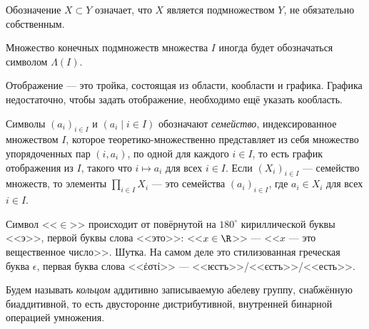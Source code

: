 \documentclass[
	extrafontsizes,
	11pt,
	hyphens,
]{memoir}
\begin{document}
\begin{notation}
Обозначение \(X \subset Y\) означает, что \(X\) является подмножеством \(Y\), не обязательно собственным.
\end{notation}

\begin{notation}
Множество конечных подмножеств множества \(I\) иногда будет обозначаться символом \(\Lambda(I)\).
\end{notation}

\begin{convention}
Отображение --- это тройка, состоящая из области, кообласти и графика.
Графика недостаточно, чтобы задать отображение, необходимо ещё указать кообласть.
\end{convention}

\begin{notation}
Символы \((a_i)_{i \in I}\) и \((a_i \mid i \in I)\) обозначают \emph{семейство}, индексированное множеством \(I\), которое теоре\-ти\-ко-мно\-жес\-твен\-но представляет из себя множество упорядоченных пар \((i,a_i)\), по одной для каждого \(i \in I\), то есть график отображения из \(I\), такого что \(i \mapsto a_i\) для всех \(i \in I\).
Если \((X_i)_{i \in I}\) --- семейство множеств, то элементы \(\prod_{i \in I} X_i\) --- это семейства \((a_i)_{i \in I}\), где \(a_i \in X_i\) для всех \(i \in I\).
\end{notation}

\begin{remark}
Символ <<\(\in\)>> происходит от повёрнутой на \(180^{\circ}\) кириллической буквы <<э>>, первой буквы слова <<это>>: <<\(x \in \R\)>> --- <<\(x\) --- это вещественное число>>. Шутка. На самом деле это стилизованная греческая буква \(\epsilon\), первая буква слова <<ἐστί>> --- <<ѥстъ>>/<<єстъ>>/<<есть>>.
\end{remark}

\begin{convention} \label{con:Ring}
Будем называть \emph{кольцом} аддитивно записываемую абелеву группу, снабжённую биаддитивной, то есть двусторонне дистрибутивной, внутренней бинарной операцией умножения.
\end{convention}

\end{document}
